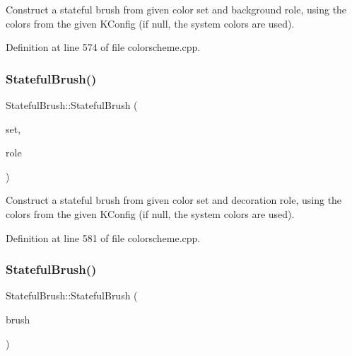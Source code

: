 Construct a stateful brush from given color set and background role, using the colors from the given K\+Config (if null, the system colors are used). 

Definition at line 574 of file colorscheme.\+cpp.

\mbox{\label{class_stateful_brush_a40d7f76bea78e8e48685f030fdbc6c0c}} 
\subsubsection{\texorpdfstring{Stateful\+Brush()}{StatefulBrush()}\hspace{0.1cm}{\footnotesize\ttfamily [4/7]}}
{\footnotesize\ttfamily Stateful\+Brush\+::\+Stateful\+Brush (\begin{DoxyParamCaption}\item[{\hyperlink{class_color_scheme_a56ea451e86dffa1822ed087902844e05}{Color\+Scheme\+::\+Color\+Set}}]{set,  }\item[{\hyperlink{class_color_scheme_a4ad022af301e30791c6c248e1fc656cf}{Color\+Scheme\+::\+Decoration\+Role}}]{role }\end{DoxyParamCaption})\hspace{0.3cm}{\ttfamily [explicit]}}

Construct a stateful brush from given color set and decoration role, using the colors from the given K\+Config (if null, the system colors are used). 

Definition at line 581 of file colorscheme.\+cpp.

\mbox{\label{class_stateful_brush_aba6fe316f65f6bc26a630374e8bffea3}} 
\subsubsection{\texorpdfstring{Stateful\+Brush()}{StatefulBrush()}\hspace{0.1cm}{\footnotesize\ttfamily [5/7]}}
{\footnotesize\ttfamily Stateful\+Brush\+::\+Stateful\+Brush (\begin{DoxyParamCaption}\item[{const Q\+Brush \&}]{brush }\end{DoxyParamCaption})\hspace{0.3cm}{\ttfamily [explicit]}}

